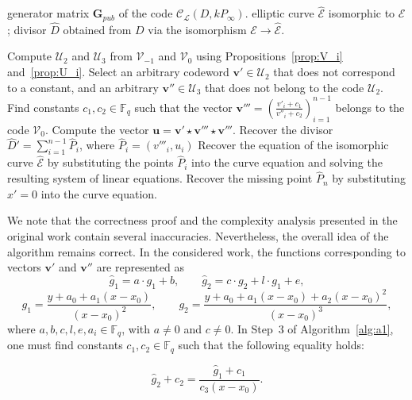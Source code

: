 \documentclass[sn-mathphys-num]{sn-jnl_modified}
\begin{document}
\begin{algorithm}[H]
\caption{Recovery of $\widehat{\mathcal{E}}$ and $\widehat{D}$ from \cite{Sh25}}
\label{alg:a1}
\begin{algorithmic}[1]
\Require generator matrix $\mathbf{G}_{pub}$ of the code $\mathcal{C}_\mathscr{L}(D, k P_\infty)$.
\Ensure elliptic curve $\widehat{\mathcal{E}}$ isomorphic to $\mathcal{E}$; divisor $\widehat{D}$ obtained from $D$ via the isomorphism $\mathcal{E} \to \widehat{\mathcal{E}}$.

\State Compute $\mathcal{U}_2$ and $\mathcal{U}_3$ from $\mathcal{V}_{-1}$ and $\mathcal{V}_0$ using Propositions~\ref{prop:V_i} and~\ref{prop:U_i}.
\State Select an arbitrary codeword $\mathbf{v}' \in \mathcal{U}_2$ that does not correspond to a constant, and an arbitrary $\mathbf{v}'' \in \mathcal{U}_3$ that does not belong to the code $\mathcal{U}_2$.
\State Find constants $c_1, c_2 \in \mathbb{F}_q$ such that the vector $\mathbf{v}''' = \left( \frac{v'_i + c_1}{v''_i + c_2} \right)_{i=1}^{n-1}$ belongs to the code $\mathcal{V}_0$.
\State Compute the vector $\mathbf{u} = \mathbf{v}' \star \mathbf{v}''' \star \mathbf{v}'''$.
\State Recover the divisor $\widehat{D}' = \sum_{i = 1}^{n-1} \widehat{P}_i$, where $\widehat{P}_i = (v'''_i, u_i)$ 
\State Recover the equation of the isomorphic curve $\widehat{\mathcal{E}}$ by substituting the points $\widehat{P}_i$ into the curve equation and solving the resulting system of linear equations.
\State Recover the missing point $\widehat{P}_n$ by substituting $x' = 0$ into the curve equation.
\end{algorithmic}
\end{algorithm}

We note that the correctness proof and the complexity analysis presented in the original work \cite{Sh25} contain several inaccuracies. Nevertheless, the overall idea of the algorithm remains correct. In the considered work, the functions corresponding to vectors $\mathbf{v}'$ and $\mathbf{v}''$ are represented as
$$
\hat{g}_1 = a\cdot g_1 + b,
\qquad
\hat{g}_2 = c\cdot g_2 + l \cdot g_1 + e,
$$
\[
g_1 = \frac{y + a_0 + a_1(x-x_0)}{(x-x_0)^2}, \qquad g_2 =\frac{y + a_0 + a_1(x-x_0) + a_2(x-x_0)^2}{(x-x_0)^3},
\]
where $a, b, c, l, e, a_i \in \mathbb{F}_q$, with $a \neq 0$ and $c \neq 0$. In Step~3 of Algorithm~\ref{alg:a1}, one must find constants $c_1, c_2 \in \mathbb{F}_q$ such that the following equality holds:

\begin{equation}\label{eq1}
\hat{g}_2 + c_2 = \frac{\hat{g}_1 + c_1}{c_3(x - x_0)}.
\end{equation}
\end{document}
